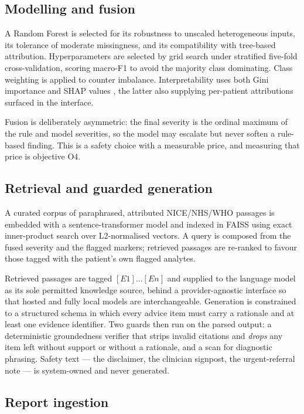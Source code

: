 \documentclass[11pt,a4paper]{article}
\begin{document}
\subsection{Modelling and fusion}

A Random Forest \cite{breiman2001random} is selected for its robustness to
unscaled heterogeneous inputs, its tolerance of moderate missingness, and its
compatibility with tree-based attribution. Hyperparameters are selected by grid
search under stratified five-fold cross-validation, scoring macro-F1 to avoid the
majority class dominating. Class weighting is applied to counter imbalance.
Interpretability uses both Gini importance and SHAP values \cite{lundberg2017shap},
the latter also supplying per-patient attributions surfaced in the interface.

Fusion is deliberately asymmetric: the final severity is the ordinal maximum of the
rule and model severities, so the model may escalate but never soften a rule-based
finding. This is a safety choice with a measurable price, and measuring that price
is objective O4.

\subsection{Retrieval and guarded generation}

A curated corpus of paraphrased, attributed NICE/NHS/WHO passages is embedded with
a sentence-transformer model and indexed in FAISS using exact inner-product search
over L2-normalised vectors. A query is composed from the fused severity and the
flagged markers; retrieved passages are re-ranked to favour those tagged with the
patient's own flagged analytes.

Retrieved passages are tagged $[E1] \ldots [En]$ and supplied to the language model
as its sole permitted knowledge source, behind a provider-agnostic interface so
that hosted and fully local models are interchangeable. Generation is constrained
to a structured schema in which every advice item must carry a rationale and at
least one evidence identifier. Two guards then run on the parsed output: a
deterministic groundedness verifier that strips invalid citations and \emph{drops}
any item left without support or without a rationale, and a scan for diagnostic
phrasing. Safety text --- the disclaimer, the clinician signpost, the urgent-referral
note --- is system-owned and never generated.

\subsection{Report ingestion}
\end{document}
